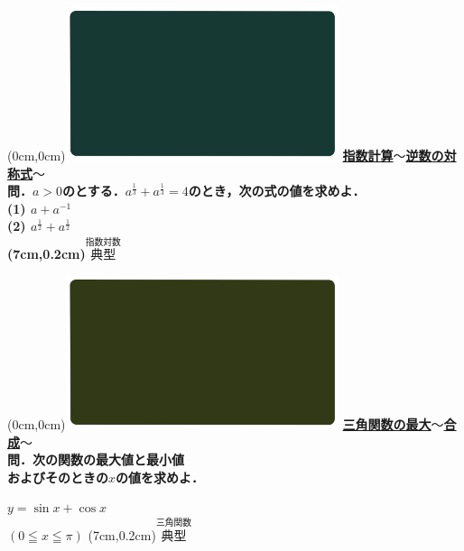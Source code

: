 \documentclass[10pt,
fleqn,
dvipdfmx,
uplatex
]{jsarticle}
\begin{document}
\newpage

\at(0cm,0cm){\includegraphics[width=8cm,bb=0 0 1920 1080]{./youtube/thumbnails/templates/smart_background/指数対数.jpeg}}
{\color{orange}\bf\boldmath\Large\underline{指数計算$〜$逆数の対称式$〜$}}\vspace{0.3zw}\\
\Large 
\bf\boldmath 問．$a>0$のとする．$a^{\frac{1}{3}}+a^{\frac{1}{3}}=4$のとき，次の式の値を求めよ．\\
(1)  $a+a^{-1}$\\
(2)  $a^{\frac{1}{2}}+a^{\frac{1}{2}}$\\

\at(7cm,0.2cm){\small\color{bradorange}$\overset{\text{指数対数}}{\text{典型}}$}



\newpage

\at(0cm,0cm){\includegraphics[width=8cm,bb=0 0 1920 1080]{./youtube/thumbnails/templates/smart_background/三角関数.jpeg}}
{\color{orange}\bf\boldmath\Large\underline{三角関数の最大$〜$合成$〜$}}\vspace{0.3zw}\\
\large 
\bf\boldmath 問．次の関数の最大値と最小値\\
\hfill およびそのときの$x$の値を求めよ．

\huge
\hspace{0.2zw} $y=\sin x+\cos x$\\ 
\hfill $\left(0\leqq x\leqq \pi \right)$
\at(7cm,0.2cm){\small\color{bradorange}$\overset{\text{三角関数}}{\text{典型}}$}

\newpage
\end{document}

